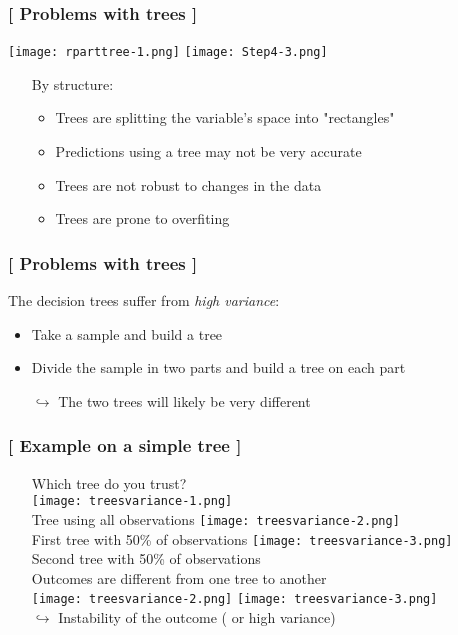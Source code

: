 \documentclass[xcolor=x11names,compress, handhouts]{beamer}
\renewcommand{\(}{\begin{columns}}
\renewcommand{\)}{\end{columns}}
\newcommand{\<}[1]{\begin{column}{#1}}
\renewcommand{\>}{\end{column}}
\begin{document}
\begin{frame} %
\frametitle{\textcolor{brique}{[ Problems with  trees ]}}
 \texttt{[image: rparttree-1.png]} \texttt{[image: Step4-3.png]}
\pause
\begin{itemize}
  \item[] By structure:
  \begin{itemize}[<+->]
    \item Trees are splitting the variable's space into "rectangles"
    \item Predictions using a tree may not be  very accurate
    \item Trees are not robust to changes in the data
    \item  Trees are prone to overfiting
  \end{itemize}
\end{itemize}
\end{frame}


\begin{frame}
\frametitle{\textcolor{brique}{[ Problems with  trees  ]}}
The decision trees  suffer from \textit{high variance}:
\pause
\begin{itemize}[<+->]
    \item Take a sample and build a tree
    \item Divide the sample in two parts and build a tree on each part
    \item[$\hookrightarrow$] The two trees will likely be very different
\end{itemize}
\end{frame}

\begin{frame} %
\frametitle{\textcolor{brique}{[ Example on a simple tree ]}}
\pause
\begin{itemize}
\item[] Which tree do you trust? \\
    {\texttt{[image: treesvariance-1.png]} \\ }
    {Tree using all observations}
    {\texttt{[image: treesvariance-2.png]} \\ }
    {First tree with 50\% of observations}
    {\texttt{[image: treesvariance-3.png]} \\ }
    {Second tree with 50\% of observations}
    { $\;$ \\}
    {Outcomes are different from one tree to another\\ }
    {\texttt{[image: treesvariance-2.png]} \texttt{[image: treesvariance-3.png]} \\ }
    {$\hookrightarrow$ Instability of the outcome ( or high variance)}
\end{itemize}
\end{frame}
\end{document}
